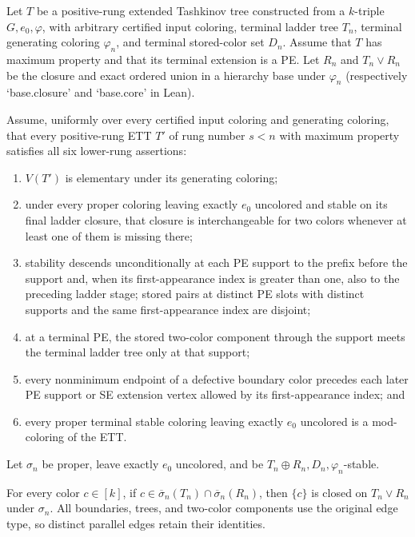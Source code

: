 \begin{lemma}
Let $T$ be a positive-rung extended Tashkinov tree constructed from a
$k$-triple $G,e_0,\varphi$, with arbitrary certified input coloring,
terminal ladder tree $T_n$, terminal generating coloring $\varphi_n$,
and terminal stored-color set $D_n$.  Assume that $T$ has maximum
property and that its terminal extension is a PE.  Let $R_n$ and
$T_n\vee R_n$ be the closure and exact ordered union in a hierarchy
base under $\varphi_n$ (respectively `base.closure' and `base.core'
in Lean).

Assume, uniformly over every certified input coloring and generating
coloring, that every positive-rung ETT $T'$ of rung number $s<n$ with
maximum property satisfies all six lower-rung assertions:
\begin{enumerate}
\item $V(T')$ is elementary under its generating coloring;
\item under every proper coloring leaving exactly $e_0$ uncolored and
stable on its final ladder closure, that closure is interchangeable for
two colors whenever at least one of them is missing there;
\item stability descends unconditionally at each PE support to the prefix before the
support and, when its first-appearance index is greater than one, also to
the preceding ladder stage; stored pairs at
distinct PE slots with distinct supports and the same first-appearance
index are disjoint;
\item at a terminal PE, the stored two-color component through the
support meets the terminal ladder tree only at that support;
\item every nonminimum endpoint of a defective boundary color precedes
each later PE support or SE extension vertex allowed by its
first-appearance index; and
\item every proper terminal stable coloring leaving exactly $e_0$
uncolored is a mod-coloring of the ETT.
\end{enumerate}

Let $\sigma_n$ be proper, leave exactly $e_0$ uncolored, and be
$T_n\oplus R_n,D_n,\varphi_n$-stable.

For every color $c\in[k]$, if
$c\in\overline\sigma_n(T_n)\cap\overline\sigma_n(R_n)$, then
$\{c\}$ is closed on $T_n\vee R_n$ under $\sigma_n$.
All boundaries, trees, and two-color components use the original edge
type, so distinct parallel edges retain their identities.
\end{lemma}
